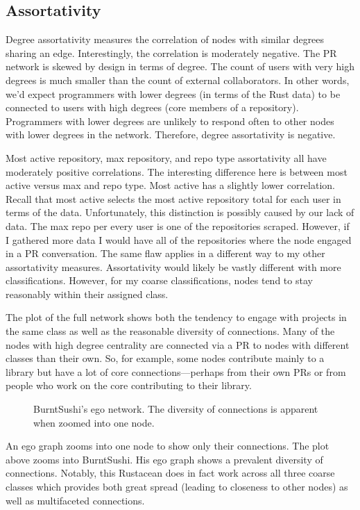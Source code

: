 \documentclass[12pt, a4paper]{article}
\begin{document}
\subsection{Assortativity}
Degree assortativity measures the correlation of nodes with similar degrees sharing an edge. Interestingly, the correlation is moderately negative. The PR network is skewed by design in terms of degree. The count of users with very high degrees is much smaller than the count of external collaborators. In other words, we'd expect programmers with lower degrees (in terms of the Rust data) to be connected to users with high degrees (core members of a repository). Programmers with lower degrees are unlikely to respond often to other nodes with lower degrees in the network. Therefore, degree assortativity is negative.

Most active repository, max repository, and repo type assortativity all have moderately positive correlations. The interesting difference here is between most active versus max and repo type. Most active has a slightly lower correlation. Recall that most active selects the most active repository total for each user in terms of the data. Unfortunately, this distinction is possibly caused by our lack of data. The max repo per every user is one of the repositories scraped. However, if I gathered more data I would have all of the repositories where the node engaged in a PR conversation. The same flaw applies in a different way to my other assortativity measures. Assortativity would likely be vastly different with more classifications. However, for my coarse classifications, nodes tend to stay reasonably within their assigned class.

The plot of the full network shows both the tendency to engage with projects in the same class as well as the reasonable diversity of connections. Many of the nodes with high degree centrality are connected via a PR to nodes with different classes than their own. So, for example, some nodes contribute mainly to a library but have a lot of core connections---perhaps from their own PRs or from people who work on the core contributing to their library.

\begin{figure}
    \caption{BurntSushi's ego network. The diversity of connections is apparent when zoomed into one node.}
    \label{fig:burntego}
\end{figure}

An ego graph zooms into one node to show only their connections. The plot above zooms into BurntSushi. His ego graph shows a prevalent diversity of connections. Notably, this Rustacean does in fact work across all three coarse classes which provides both great spread (leading to closeness to other nodes) as well as multifaceted connections.
\end{document}
